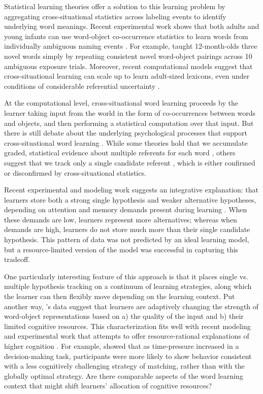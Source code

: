 \documentclass[10pt,letterpaper]{article}
\begin{document}
Statistical learning theories offer a solution to this learning problem by aggregating cross-situational statistics across labeling events to identify underlying word meanings. Recent experimental work shows that both adults and young infants can use word-object co-occurrence statistics to learn words from individually ambiguous naming events \cite{smith2008infants, vouloumanos2008fine}. For example,  taught 12-month-olds three novel words simply by repeating consistent novel word-object pairings across 10 ambiguous exposure trials. Moreover, recent computational models suggest that cross-situational learning can scale up to learn adult-sized lexicons, even under conditions of considerable referential uncertainty \cite{smith2011cross}.

At the computational level, cross-situational word learning proceeds by the learner taking input from the world in the form of co-occurrences between words and objects, and then performing a statistical computation over that input. But there is still debate about the underlying psychological processes that support cross-situational word learning \cite{smith2014unrealized}. While some theories hold that we accumulate graded, statistical evidence about multiple referents for each word \cite{mcmurray2012word}, others suggest that we track only a single candidate referent \cite{trueswell2013propose}, which is either confirmed or disconfirmed by cross-situational statistics.  


Recent experimental and modeling work suggests an integrative explanation: that learners store both a strong single hypothesis and weaker alternative hypotheses, depending on attention and memory demands present during learning \cite{yurovsky2014algorithmic}. When these demands are low, learners represent more alternatives; whereas when demands are high, learners do not store much more than their single candidate hypothesis. This pattern of data was not predicted by an ideal learning model, but a resource-limited version of the model was successful in capturing this tradeoff.

One particularly interesting feature of this approach is that it places single vs. multiple hypothesis tracking on a continuum of learning strategies, along which the learner can then flexibly move depending on the learning context. Put another way, 's data suggest that learners are adaptively changing the strength of word-object representations based on a) the quality of the input and b) their limited cognitive resources. This characterization fits well with recent modeling and experimental work that attempts to offer resource-rational explanations of higher cognition \cite{griffiths2014rational}. For example,  showed that as time-pressure increased in a decision-making task, participants were more likely to show behavior consistent with a less cognitively challenging strategy of matching, rather than with the globally optimal strategy. Are there comparable aspects of the word learning context that might shift learners' allocation of cognitive resources?
\end{document}
